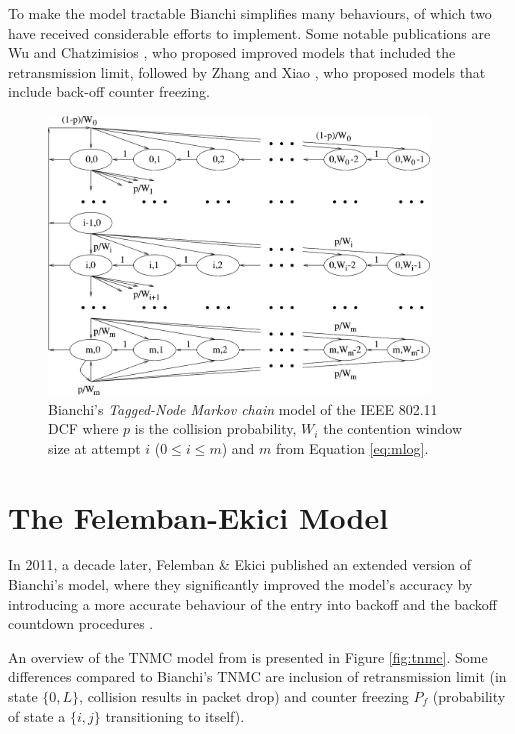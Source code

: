 To make the model tractable Bianchi simplifies many behaviours, of which two
have received considerable efforts to implement. Some notable publications
are Wu \cite{1019305} and Chatzimisios \cite{1258379}, who proposed improved
models that included the retransmission limit, followed by Zhang
\cite{article} and Xiao \cite{1512111}, who proposed models that include
back-off counter freezing.

\begin{figure}
\center
\includegraphics[width=0.9\textwidth]{images/bianchi-model.png}
\caption{Bianchi's \emph{Tagged-Node Markov chain} model of the IEEE 802.11 DCF where $p$ is the collision probability, $W_i$ the contention window size at attempt $i$ ($0 \leq i \leq m$) and $m$ from Equation \ref{eq:mlog}.}
\label{fig:btnmc}
\end{figure}

\section{The Felemban-Ekici Model}

In 2011, a decade later, Felemban \& Ekici published an extended version of
Bianchi's model, where they significantly improved the model's accuracy by
introducing a more accurate behaviour of the entry into backoff and the
backoff countdown procedures \cite{felemban}.

An overview of the TNMC model from \cite{felemban} is presented in Figure
\ref{fig:tnmc}. Some differences compared to Bianchi's TNMC are inclusion of
retransmission limit (in state $\{0,L\}$, collision results in packet drop)
and counter freezing $P_f$ (probability of state a $\{i,j\}$ transitioning to
itself).

